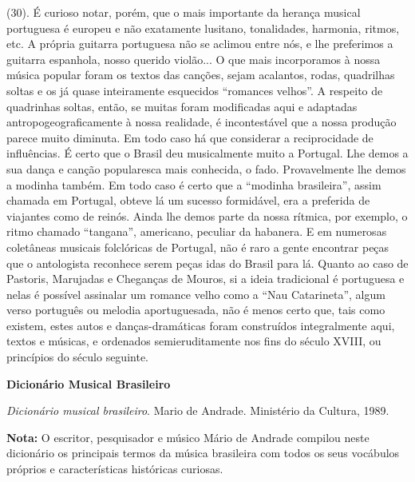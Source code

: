 (30). É curioso notar, porém, que o mais importante da herança musical
portuguesa é europeu e não exatamente lusitano, tonalidades, harmonia,
ritmos, etc. A própria guitarra portuguesa não se aclimou entre nós, e
lhe preferimos a guitarra espanhola, nosso querido violão... O que mais
incorporamos à nossa música popular foram os textos das canções, sejam
acalantos, rodas, quadrilhas soltas e os já quase inteiramente
esquecidos ``romances velhos''. A respeito de quadrinhas soltas, então,
se muitas foram modificadas aqui e adaptadas antropogeograficamente à
nossa realidade, é incontestável que a nossa produção parece muito
diminuta. Em todo caso há que considerar a reciprocidade de influências.
É certo que o Brasil deu musicalmente muito a Portugal. Lhe demos a sua
dança e canção popularesca mais conhecida, o fado. Provavelmente lhe
demos a modinha também. Em todo caso é certo que a ``modinha
brasileira'', assim chamada em Portugal, obteve lá um sucesso
formidável, era a preferida de viajantes como de reinós. Ainda lhe demos
parte da nossa rítmica, por exemplo, o ritmo chamado ``tangana'',
americano, peculiar da habanera. E em numerosas coletâneas musicais
folclóricas de Portugal, não é raro a gente encontrar peças que o
antologista reconhece serem peças idas do Brasil para lá. Quanto ao caso
de Pastoris, Marujadas e Cheganças de Mouros, si a ideia tradicional é
portuguesa e nelas é possível assinalar um romance velho como a ``Nau
Catarineta'', algum verso português ou melodia aportuguesada, não é
menos certo que, tais como existem, estes autos e danças-dramáticas
foram construídos integralmente aqui, textos e músicas, e ordenados
semieruditamente nos fins do século XVIII, ou princípios do século
seguinte.

\textbf{Dicionário Musical Brasileiro}

\emph{Dicionário musical brasileiro}. Mario de Andrade. Ministério da
Cultura, 1989.

\textbf{Nota:} O escritor, pesquisador e músico Mário de Andrade
compilou neste dicionário os principais termos da música brasileira com
todos os seus vocábulos próprios e características históricas curiosas.

